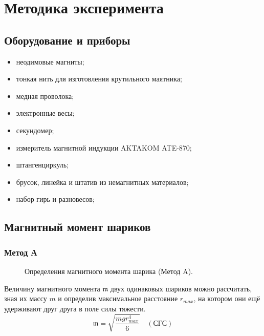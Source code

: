 \documentclass[12pt,a4paper]{article}
\begin{document}
	\section*{Методика эксперимента}
	
	\subsection*{Оборудование и приборы}
	\begin{itemize}[itemsep = 0pt, parsep=0pt]
		\item неодимовые магниты;
		\item тонкая нить для изготов­ления крутильного маятника;
		\item медная проволока;
		\item электронные весы;
		\item секундомер;
		\item измеритель магнитной индукции AKTAKOM ATE-870;
		\item штангенциркуль;
		\item брусок, линейка и штатив из немагнитных материалов;
		\item набор гирь и разновесов;
	\end{itemize}
	
	\subsection*{Магнитный момент шариков}
		
	\subsubsection*{Метод А}
	
	\begin{figure}
		\vspace{-0pt}
		\caption{Определения магнитного момента шарика (Метод A).}
		\label{img:method_a}
	\end{figure}
	Величину магнитного момента $\mathfrak{m}$ двух
	одинаковых шариков можно рассчитать, зная их массу $m$ и определив максимальное расстояние $r_{max}$, на котором они ещё удерживают друг друга в поле силы тяжести.
	$$ \mathfrak{m} = \sqrt{\frac{mgr_{max}^4}{6}} \quad (\text{СГС}) $$
	
\end{document}
